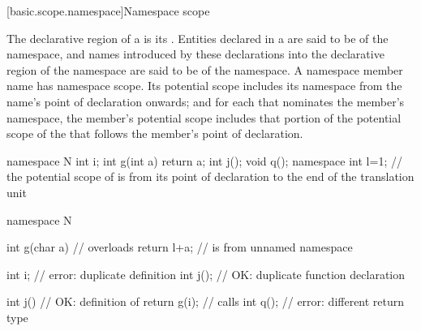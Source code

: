 [basic.scope.namespace]{Namespace scope}

\pnum
{}%
The declarative region of a  is its
.  Entities declared in a
 are said to be  of the
namespace, and names introduced by these declarations into the
declarative region of the namespace are said to be  of the namespace. A namespace member name has namespace scope.
Its potential scope includes its namespace from the name's point of
declaration onwards; and for each
 that nominates the
member's namespace, the member's potential scope includes that portion
of the potential scope of the  that follows
the member's point of declaration.
\begin{example}
\begin{codeblock}
namespace N {
  int i;
  int g(int a) { return a; }
  int j();
  void q();
}
namespace { int l=1; }
// the potential scope of  is from its point of declaration to the end of the translation unit

namespace N {
  int g(char a) {   // overloads 
    return l+a;     //  is from unnamed namespace
  }

  int i;            // error: duplicate definition
  int j();          // OK: duplicate function declaration

  int j() {         // OK: definition of 
    return g(i);    // calls 
  }
  int q();          // error: different return type
}
\end{codeblock}
\end{example}

